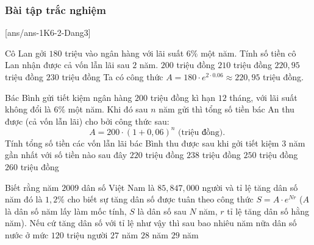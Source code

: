 \subsubsection{Bài tập trắc nghiệm}
[ans/ans-1K6-2-Dang3]
\begin{ex}
	Cô Lan gởi $180$ triệu vào ngân hàng với lãi suất $6\%$ một năm. Tính số tiền cô Lan nhận được cả vốn lẫn lãi sau $2$ năm.
	\choice 
	{ $200$ triệu đồng}
	{ $210$ triệu đồng}
	{\True $220{,}95$ triệu đồng}
	{$230$ triệu đồng}
	\loigiai 
	{Ta có công thức $A=180 \cdot e^{2 \cdot 0.06} \approx 220{,}95$ triệu đồng.}
\end{ex}	
\begin{ex} %
	Bác Bình gửi tiết kiệm ngân hàng $200$ triệu đồng kì hạn $12$ tháng, với lãi suất không đổi là $6 \%$ một năm. Khi đó sau $n$ năm gửi thì tổng số tiền bác An thu được (cả vốn lẫn lãi) cho bởi công thức sau:
	$$
	A=200 \cdot(1+0,06)^n \text { (triệu đồng). }
	$$
	Tính tổng số tiền các vốn lẫn lãi bác Bình thu được sau khi gởi tiết kiệm $3$ năm gần nhất với số tiền nào sau đây
	\choice 
	{ $220$ triệu đồng}
	{\True $238$ triệu đồng}
	{ $250$ triệu đồng}
	{$260$ triệu đồng}
\end{ex}
\begin{ex} %
	Biết rằng năm $2009$ dân số Việt Nam là $85{,}847{,}000$ người và tỉ lệ tăng dân số năm đó là $1{,}2\%$ cho biết sự tăng dân số được tuân theo công thức $S=A \cdot e^{Nr}$ ($A$ là dân số năm lấy làm mốc tính, $S$ là dân số sau $N$ năm, $r$ tỉ lệ tăng dân số hằng năm). Nếu cứ tăng dân số với tỉ lệ như vậy thì sau bao nhiêu năm nữa dân số nước ở mức $120$ triệu người
	 { $27$ năm} {\True $28$ năm} { $29$ năm}
\end{ex}
